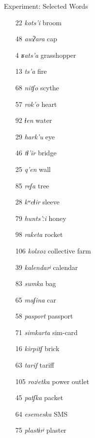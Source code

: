 \documentclass[13pt, t]{beamer}
\begin{document}
\begin{frame}{Experiment: Selected Words}
\begin{multicols}{2}
\begin{itemize}
\item[22]    \textit{kots'i} broom
\item[48]    \textit{awʔara} cap
\item[4] \textit{ʁats'a} grasshopper
\item[13]      \textit{ts'a} fire
\item[68]      \textit{nitʃo} scythe
\item[57]    \textit{rok'o} heart
\item[92]        \textit{ɬen} water
\item[29]     \textit{hark'u} eye
\item[46]      \textit{tɬ'ir} bridge
\item[25]      \textit{q'en} wall
\item[85]     \textit{reʃa} tree
\item[28]    \textit{kʷeɬir} sleeve
\item[79]    \textit{hunts'ːi} honey
\item[98]       \textit{raketa }rocket
\item[106]       \textit{kolxoz }collective farm
\item[39] 	\textit{kalendarʲ} calendar
\item[83]         \textit{sumka} bag
\item[65]       \textit{maʃina} car
\item[58]    \textit{pasport} passport
\item[71]       \textit{simkarta}  sim-card
\item[16]      \textit{kirpitʃ} brick
\item[63]         \textit{tarif} tariff
\item[105]    \textit{rozʲetka}  power outlet
\item[45]        \textit{patʃka} packet
\item[64]      \textit{esemeska} SMS
\item[75]   \textit{plastɨrʲ} plaster
\end{itemize}
\end{multicols}
\end{frame}
\end{document}
